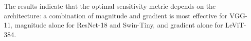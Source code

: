 \documentclass[11pt, conference]{IEEEtran}
\begin{document}
The results indicate that the optimal sensitivity metric depends on the architecture: a combination of magnitude and gradient is most effective for VGG-11, magnitude alone for ResNet-18 and Swin-Tiny, and gradient alone for LeViT-384.









\end{document}
